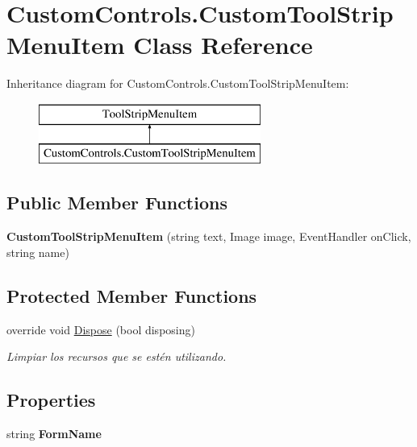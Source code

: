 \hypertarget{class_custom_controls_1_1_custom_tool_strip_menu_item}{}\section{Custom\+Controls.\+Custom\+Tool\+Strip\+Menu\+Item Class Reference}
\label{class_custom_controls_1_1_custom_tool_strip_menu_item}
Inheritance diagram for Custom\+Controls.\+Custom\+Tool\+Strip\+Menu\+Item\+:\begin{figure}[H]
\begin{center}
\leavevmode
\includegraphics[height=2.000000cm]{class_custom_controls_1_1_custom_tool_strip_menu_item}
\end{center}
\end{figure}
\subsection*{Public Member Functions}
\begin{DoxyCompactItemize}
\item 
\mbox{\label{class_custom_controls_1_1_custom_tool_strip_menu_item_a3b07c5d51a0a1b0d2c1bfa23489e0454}} 
{\bfseries Custom\+Tool\+Strip\+Menu\+Item} (string text, Image image, Event\+Handler on\+Click, string name)
\end{DoxyCompactItemize}
\subsection*{Protected Member Functions}
\begin{DoxyCompactItemize}
\item 
override void \hyperlink{class_custom_controls_1_1_custom_tool_strip_menu_item_a09da84511dccda9f78441c82ff2f4508}{Dispose} (bool disposing)
\begin{DoxyCompactList}\small\item\em Limpiar los recursos que se estén utilizando. \end{DoxyCompactList}\end{DoxyCompactItemize}
\subsection*{Properties}
\begin{DoxyCompactItemize}
\item 
\mbox{\label{class_custom_controls_1_1_custom_tool_strip_menu_item_a2533ed0f2c4c4b248b1abc49e716c2a6}} 
string {\bfseries Form\+Name}
\end{DoxyCompactItemize}


